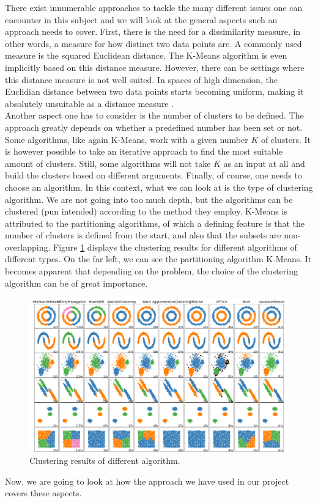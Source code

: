 \documentclass[]{report}
\begin{document}
There exist innumerable approaches to tackle the many different issues one can encounter in this subject and we will look at the general aspects such an approach needs to cover. First, there is the need for a dissimilarity measure, in other words, a measure for how distinct two data points are. A commonly used measure is the squared Euclidean distance. The K-Means algorithm is even implicitly based on this distance measure. However, there can be settings where this distance measure is not well suited. In spaces of high dimension, the Euclidian distance between two data points starts becoming uniform, making it absolutely unsuitable as a distance measure \cite{distmetricsbehavior}.\\
Another aspect one has to consider is the number of clusters to be defined. The approach greatly depends on whether a predefined number has been set or not. Some algorithms, like again K-Means, work with a given number $K$ of clusters. It is however possible to take an iterative approach to find the most suitable amount of clusters. Still, some algorithms will not take $K$ as an input at all and build the clusters based on different arguments.
Finally, of course, one needs to choose an algorithm. In this context, what we can look at is the type of clustering algorithm. We are not going into too much depth, but the algorithms can be clustered (pun intended) according to the method they employ. K-Means is attributed to the partitioning algorithms, of which a defining feature is that the number of clusters is defined from the start, and also that the subsets are non-overlapping. Figure \ref{fig:clustermethodcomparison} displays the clustering results for different algorithms of different types. On the far left, we can see the partitioning algorithm K-Means. It becomes apparent that depending on the problem, the choice of the clustering algorithm can be of great importance.  \\
\begin{figure}[h]
	\centering
	\includegraphics[width=0.7\linewidth]{Images/cluster_method_comparison}
	\caption[Clustering methods]{Clustering results of different algorithm.}
	\label{fig:clustermethodcomparison}
\end{figure}

Now, we are going to look at how the approach we have used in our project covers these aspects.


\printbibliography[title={References}]
\end{document}
